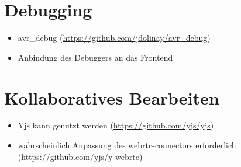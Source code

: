 \section{Debugging}

\begin{itemize}
    \item avr\_debug (\href{https://github.com/jdolinay/avr_debug}{https://github.com/jdolinay/avr\_debug})
    \item Anbindung des Debuggers an das Frontend
\end{itemize}

\section{Kollaboratives Bearbeiten}

\begin{itemize}
    \item Yjs kann genutzt werden (\href{https://github.com/yjs/yjs}{https://github.com/yjs/yjs})
    \item wahrscheinlich Anpassung des webrtc-connectors erforderlich \\ (\href{https://github.com/yjs/y-webrtc}{https://github.com/yjs/y-webrtc})
\end{itemize}